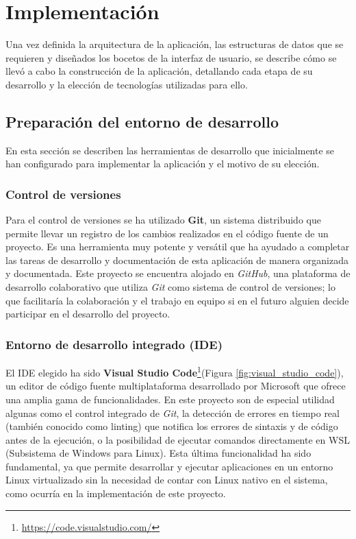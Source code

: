 \chapter{Implementación}

Una vez definida la arquitectura de la aplicación, las estructuras de datos que se requieren y diseñados los bocetos de la interfaz de usuario, se describe cómo se llevó a cabo la construcción de la aplicación, detallando cada etapa de su desarrollo y la elección de tecnologías utilizadas para ello.

\section{Preparación del entorno de desarrollo}
En esta sección se describen las herramientas de desarrollo que inicialmente se han configurado para implementar la aplicación y el motivo de su elección.

\subsection{Control de versiones}
Para el control de versiones se ha utilizado \textbf{Git}, un sistema distribuido que permite llevar un registro de los cambios realizados en el código fuente de un proyecto. Es una herramienta muy potente y versátil que ha ayudado a completar las tareas de desarrollo y documentación de esta aplicación de manera organizada y documentada. Este proyecto se encuentra alojado en \textit{GitHub}, una plataforma de desarrollo colaborativo que utiliza \textit{Git} como sistema de control de versiones; lo que facilitaría la colaboración y el trabajo en equipo si en el futuro alguien decide participar en el desarrollo del proyecto.

\subsection{Entorno de desarrollo integrado (IDE)}
El IDE elegido ha sido \textbf{Visual Studio Code}\footnote{\url{https://code.visualstudio.com/}}(Figura \ref{fig:visual_studio_code}), un editor de código fuente multiplataforma desarrollado por Microsoft que ofrece una amplia gama de funcionalidades. En este proyecto son de especial utilidad algunas como el control integrado de \textit{Git}, la detección de errores en tiempo real (también conocido como linting) que notifica los errores de sintaxis y de código antes de la ejecución, o la posibilidad de ejecutar comandos directamente en WSL (Subsistema de Windows para Linux). Esta última funcionalidad ha sido fundamental, ya que permite desarrollar y ejecutar aplicaciones en un entorno Linux virtualizado sin la necesidad de contar con Linux nativo en el sistema, como ocurría en la implementación de este proyecto.

